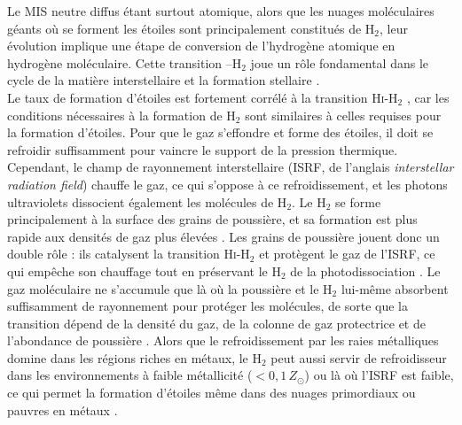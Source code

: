 Le MIS neutre diffus étant surtout atomique, alors que les nuages moléculaires géants où se forment les étoiles sont principalement constitués de H$_2$, leur évolution implique une étape de conversion de l'hydrogène atomique en hydrogène moléculaire. Cette transition \HI--H$_2$ joue un rôle fondamental dans le cycle de la matière interstellaire et la formation stellaire \citep{Lee2012, Sternberg2014, Klessen2016}.\\\indent
Le taux de formation d'étoiles est fortement corrélé à la transition \textrm{H\textsc{i}}-H$_2$ \citep{Krumholtz2011}, car les conditions nécessaires à la formation de H$_2$ sont similaires à celles requises pour la formation d'étoiles. Pour que le gaz s'effondre et forme des étoiles, il doit se refroidir suffisamment pour vaincre le support de la pression thermique. Cependant, le champ de rayonnement interstellaire (ISRF, de l'anglais \textit{interstellar radiation field}) chauffe le gaz, ce qui s'oppose à ce refroidissement, et les photons ultraviolets dissocient également les molécules de H$_2$. Le H$_2$ se forme principalement à la surface des grains de poussière, et sa formation est plus rapide aux densités de gaz plus élevées \citep{GloverMacLow2007}. Les grains de poussière jouent donc un double rôle : ils catalysent la transition \textrm{H\textsc{i}}-H$_2$ et protègent le gaz de l'ISRF, ce qui empêche son chauffage tout en préservant le H$_2$ de la photodissociation \citep{Klessen2016}. Le gaz moléculaire ne s'accumule que là où la poussière et le H$_2$ lui-même absorbent suffisamment de rayonnement pour protéger les molécules, de sorte que la transition dépend de la densité du gaz, de la colonne de gaz protectrice et de l'abondance de poussière \citep{Krumholz2009Transition,Sternberg2014}. Alors que le refroidissement par les raies métalliques domine dans les régions riches en métaux, le H$_2$ peut aussi servir de refroidisseur dans les environnements à faible métallicité ($< 0{,}1\,Z_\odot$) ou là où l'ISRF est faible, ce qui permet la formation d'étoiles même dans des nuages primordiaux ou pauvres en métaux \citep{Glover2014}.
